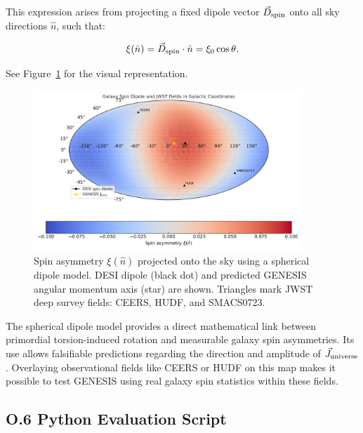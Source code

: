 \documentclass{article}
\begin{document}
This expression arises from projecting a fixed dipole vector $\vec{D}_{\rm spin}$ onto all sky directions $\hat{n}$, such that:

\begin{equation}\label{eq:auto226}
\xi(\hat{n}) = \vec{D}_{\rm spin} \cdot \hat{n} = \xi_0 \cos \theta.
\end{equation}

\vspace{0.2cm}
\noindent
See Figure~\ref{fig:spin_dipole_final} for the visual representation.




\begin{figure}[h!]
\centering
\includegraphics[width=0.9\textwidth]{Spin_Dipole_Mollweide_JWST_corrected.pdf}
\caption{Spin asymmetry $\xi(\hat{n})$ projected onto the sky using a spherical dipole model. DESI dipole (black dot) and predicted GENESIS angular momentum axis (star) are shown. Triangles mark JWST deep survey fields: CEERS, HUDF, and SMACS0723.}
\label{fig:spin_dipole_final}
\end{figure}


\begin{tcolorbox}[colback=gray!5, colframe=black!30, title=Why this matters]
The spherical dipole model provides a direct mathematical link between primordial torsion-induced rotation and measurable galaxy spin asymmetries. Its use allows falsifiable predictions regarding the direction and amplitude of $\vec{J}_{\rm universe}$. Overlaying observational fields like CEERS or HUDF on this map makes it possible to test GENESIS using real galaxy spin statistics within these fields.
\end{tcolorbox}


\subsection*{O.6 Python Evaluation Script}
\end{document}
